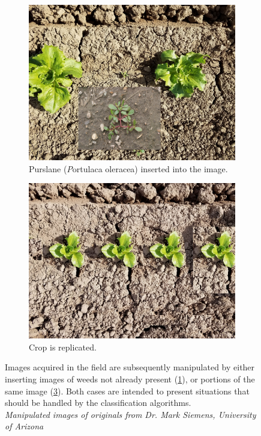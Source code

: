 \documentclass[letterpaper]{article}
\begin{document}
\begin{figure}[H]
	\begin{subfigure}[h]{0.48\linewidth}
		\includegraphics[width=1\linewidth]{./figures/with-purslane.jpg}
		\caption{Purslane (\textit Portulaca oleracea) inserted into the image.}
		\label{fig:prepared-weed}
	\end{subfigure}
	\hfill
	\begin{subfigure}[h]{0.48\linewidth}
		\includegraphics[width=1\linewidth]{./figures/thinning.jpg}
		\caption{Crop is replicated.}
		\label{fig:prepared-thinning}		
	\end{subfigure}%
	\caption[Prepared images]{Images acquired in the field are subsequently manipulated by either inserting images of weeds not already present (\ref{fig:prepared-weed}), or portions of the same image (\ref{fig:prepared-thinning}). Both cases are intended to present situations that should be handled by the classification algorithms. \\ \textit{Manipulated images of originals from Dr. Mark Siemens, University of Arizona}}
\end{figure}
\end{document}
